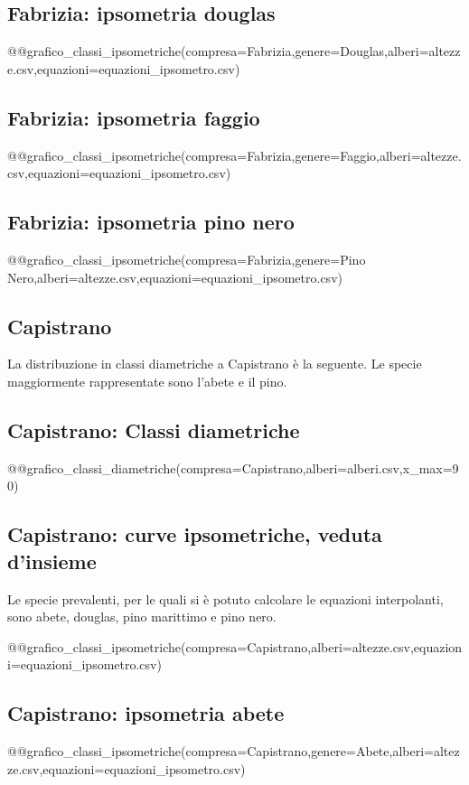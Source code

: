 \subsection*{Fabrizia: ipsometria douglas}
@@grafico_classi_ipsometriche(compresa=Fabrizia,genere=Douglas,alberi=altezze.csv,equazioni=equazioni_ipsometro.csv)
\clearpage

\subsection*{Fabrizia: ipsometria faggio}
@@grafico_classi_ipsometriche(compresa=Fabrizia,genere=Faggio,alberi=altezze.csv,equazioni=equazioni_ipsometro.csv)

\subsection*{Fabrizia: ipsometria pino nero}
@@grafico_classi_ipsometriche(compresa=Fabrizia,genere=Pino Nero,alberi=altezze.csv,equazioni=equazioni_ipsometro.csv)
\clearpage

\subsection{Capistrano}

La distribuzione in classi diametriche a Capistrano è la seguente. Le specie maggiormente rappresentate sono l'abete e il pino.

\subsection*{Capistrano: Classi diametriche}
@@grafico_classi_diametriche(compresa=Capistrano,alberi=alberi.csv,x_max=90)

\subsection*{Capistrano: curve ipsometriche, veduta d'insieme}
Le specie prevalenti, per le quali si è potuto calcolare le equazioni interpolanti, sono abete, douglas, pino marittimo e pino nero.

@@grafico_classi_ipsometriche(compresa=Capistrano,alberi=altezze.csv,equazioni=equazioni_ipsometro.csv)
\clearpage

\subsection*{Capistrano: ipsometria abete}
@@grafico_classi_ipsometriche(compresa=Capistrano,genere=Abete,alberi=altezze.csv,equazioni=equazioni_ipsometro.csv)

